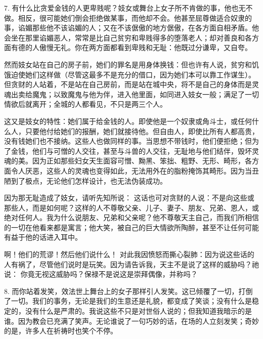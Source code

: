 7. 有什么比贪爱金钱的人更卑贱呢？妓女或舞台上女子所不肯做的事，他也无不做。相反，很可能她们倒会拒绝做某事，而他却不会。他甚至屈尊做适合奴隶的事，谄媚那些他不该谄媚的人；又在不该倨傲的地方倨傲，在各方面自相矛盾。他会坐在那里谄媚恶人，常常是比自己贫穷和卑贱得多的堕落老人；却对善良和各方面有德的人傲慢无礼。你在两方面都看到卑贱和无耻：他既过分谦卑，又自夸。\par

然而妓女站在自己的房子前，她们的罪名是用身体换钱：但也许有人说，贫穷和饥饿迫使她们这样做（尽管这最多不是充分的借口，因为她们本可以靠工作谋生）。但贪财的人站着，不是站在自己房前，而是站在城中央，将不是自己的身体而是灵魂出卖给魔鬼；以致魔鬼与他为伴，进入他里面，如同进入妓女一般；满足了一切情欲后就离开；全城的人都看见，不只是两三个人。\par

这又是妓女的特性：她们属于给金钱的人。即使他是一个奴隶或角斗士，或任何什么人，只要他付给她们的报酬，她们就接待他。但自由人，即使比所有人都高贵，没有钱她们也不接纳。这些人也做同样的事。当思想不带钱时，他们便拒绝；但为了金钱，他们与可憎的人交往，甚至与斗兽的人交往，无耻地与他们结伴，毁坏灵魂的美。因为正如那些妇女天生面容可憎、黝黑、笨拙、粗野、无形、畸形，各方面令人厌恶，这些人的灵魂也变得如此，无法用外在的脂粉掩饰其畸形。因为当丑陋到了极点，无论他们怎样设计，也无法伪装成功。\par

因为那无耻造成了妓女，请听先知所说：  这话也可对贪财的人说：不是向这些或那些人，而是如何呢？这样的人不尊敬父亲、儿子、妻子、朋友、兄弟、恩人，或绝对任何人。我为什么说朋友、兄弟和父亲呢？他不尊敬天主自己，而我们所相信的一切在他看来都是寓言；他大笑，被自己的巨大情欲所陶醉，甚至不让任何可能有益于他的话进入耳中。\par

啊！他们的荒谬！然后他们说什么！ 对此我因愤怒而撕心裂肺：因为说这些话的人有祸了，尽管他们说时是玩笑。因为请告诉我，天主不是说了这样的威胁吗？祂说：  你竟无视这威胁吗？保禄不是说这是崇拜偶像，并称吗？\par

8. 而你站着发笑，效法世上舞台上的女子那样引人发笑。这已倾覆了一切，打倒了一切。我们的事务，无论是我们的生意还是礼貌，都变成了笑谈；没有什么是稳定的，没有什么是严肃的。我说这些不只是对世俗人说的；但我知道我暗示的是谁。因为教会已充满了笑声。无论谁说了一句巧妙的话，在场的人立刻发笑；奇妙的是，许多人在祈祷时也笑个不停。\par

